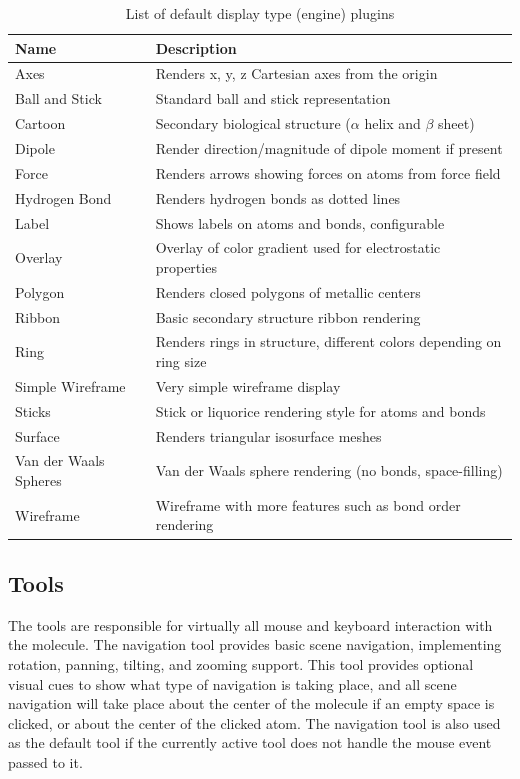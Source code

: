 \documentclass[10pt]{bmc_article}
\newenvironment{bmcformat}{\begin{raggedright}
\baselineskip20pt\sloppy\setboolean{publ}{false}}{\end{raggedright}
\baselineskip20pt\sloppy}
\begin{document}
\begin{bmcformat}
\begin{table}
\caption{List of default display type (engine) plugins}
\begin{tabular}{l | l}
\hline
Name & Description \\
\hline
Axes & Renders x, y, z Cartesian axes from the origin \\
Ball and Stick & Standard ball and stick representation \\
Cartoon & Secondary biological structure ($\alpha$ helix and $\beta$ sheet) \\
Dipole & Render direction/magnitude of dipole moment if present \\
Force & Renders arrows showing forces on atoms from force field \\
Hydrogen Bond & Renders hydrogen bonds as dotted lines \\
Label & Shows labels on atoms and bonds, configurable \\
Overlay & Overlay of color gradient used for electrostatic properties \\
Polygon & Renders closed polygons of metallic centers \\
Ribbon & Basic secondary structure ribbon rendering \\
Ring & Renders rings in structure, different colors depending on ring size \\
Simple Wireframe & Very simple wireframe display \\
Sticks & Stick or liquorice rendering style for atoms and bonds \\
Surface &Renders triangular isosurface meshes \\
Van der Waals Spheres & Van der Waals sphere rendering (no bonds, space-filling) \\
Wireframe & Wireframe with more features such as bond order rendering \\
\hline
\end{tabular}
\end{table}

\subsection{Tools}

The tools are responsible for virtually all mouse and keyboard interaction with
the molecule. The navigation tool provides basic scene navigation, implementing
rotation, panning, tilting, and zooming support. This tool provides optional
visual cues to show what type of navigation is taking place, and all scene
navigation will take place about the center of the molecule if an empty space is
clicked, or about the center of the clicked atom. The navigation tool is also
used as the default tool if the currently active tool does not handle the mouse
event passed to it.


\end{bmcformat}
\end{document}
